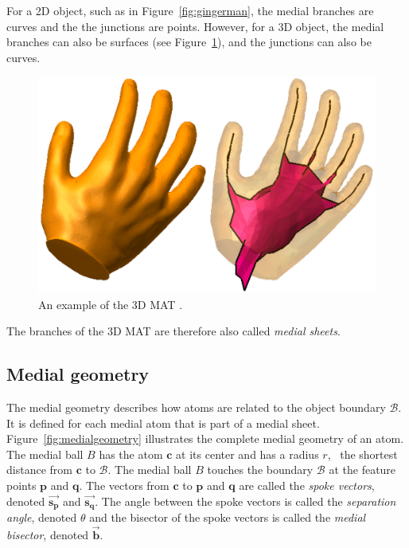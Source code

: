 For a 2D object, such as in Figure~\ref{fig:gingerman}, the medial branches are curves and the the junctions are points. 
However, for a 3D object, the medial branches can also be surfaces (see Figure~\ref{fig:amentahand}), and the junctions can also be curves.
\begin{figure}[bp]
	\centering
	\includegraphics[width=0.6\linewidth]{figs/amenta_hand.png}
	\caption{An example of the 3D MAT \citep{Amenta01pc}.}
	\label{fig:amentahand}
\end{figure}
The branches of the 3D MAT are therefore also called \emph{medial sheets}.

\subsection{Medial geometry}
The medial geometry describes how atoms are related to the object boundary $\mathcal{B}$. 
It is defined for each medial atom that is part of a medial sheet. 
Figure~\ref{fig:medialgeometry} illustrates the complete medial geometry of an atom.
The medial ball $B$ has the atom $\mathbf{c}$ at its center and has a radius $r$, \ie\ the shortest distance from $\mathbf{c}$ to $\mathcal{B}$.
The medial ball $B$ touches the boundary $\mathcal{B}$ at the feature points $\mathbf{p}$ and $\mathbf{q}$.
The vectors from $\mathbf{c}$ to $\mathbf{p}$ and $\mathbf{q}$ are called the \emph{spoke vectors}, denoted $\vec{\mathbf{s_{p}}}$ and $\vec{\mathbf{s_{q}}}$. 
The angle between the spoke vectors is called the \emph{separation angle}, denoted $\theta$ and the bisector of the spoke vectors is called the \emph{medial bisector}, denoted $\vec{\mathbf{b}}$.

